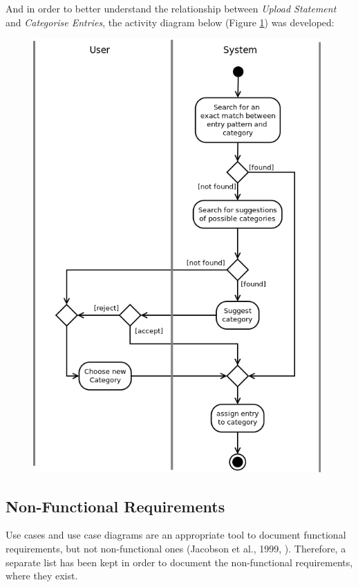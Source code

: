 And in order to better understand the relationship between \emph{Upload
Statement} and \emph{Categorise Entries}, the activity diagram below (Figure \ref{fig:AD.CategoriseEntries}) was
developed:
\begin{figure}[ht!]
  \begin{center}
    \includegraphics[width=11cm]{./contents/img/Activity_Diagram_-_Categorise_Entries.png}
  \end{center}
  \caption{}
  \label{fig:AD.CategoriseEntries}
\end{figure}
\FloatBarrier


\subsection{Non-Functional Requirements} \label{sec:Requirements.NonFunctionalRequirements}
Use cases and use case diagrams are an appropriate tool to document functional
requirements, but not non-functional ones (Jacobson et al., 1999,
\cite[cited][p.~153]{bennett2010object}). Therefore, a separate list has been
kept in order to document the non-functional requirements, where they exist.

